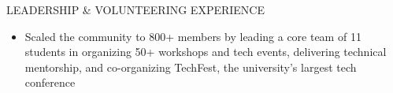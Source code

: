 \documentclass{resume}
\begin{document}
\begin{rSection}{LEADERSHIP \& VOLUNTEERING EXPERIENCE}
       \begin{itemize}
           \itemsep -2.5pt {} 
           \item Scaled the community to 800+ members by leading a core team of 11 students in organizing 50+ workshops and tech events, delivering technical mentorship, and co-organizing TechFest, the university's largest tech conference
        \end{itemize}
   
        \end{rSection}
\end{document}
